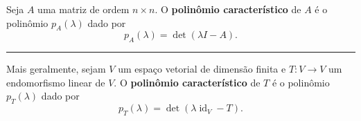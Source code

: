 \begin{definition}
	Seja $A$ uma matriz de ordem $n\times n$. O \textbf{polinômio característico} de $A$ é o polinômio $p_A(\lambda)$ dado por
	\[p_A(\lambda)=\det(\lambda I-A).\]

	\hrule
	
	Mais geralmente, sejam $V$ um espaço vetorial de dimensão finita e $T\colon V\to V$ um endomorfismo linear de $V$. O \textbf{polinômio característico} de $T$ é o polinômio $p_T(\lambda)$ dado por
	\[p_T(\lambda)=\det(\lambda\operatorname{id}_V-T).\]
\end{definition}